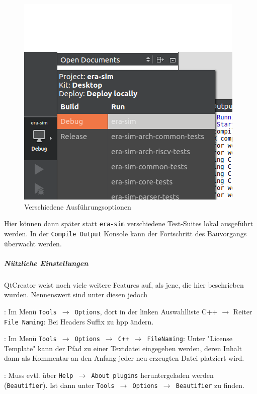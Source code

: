 \begin{figure}[h!]
	\centering
	\includegraphics[trim={1.4cm 0cm 0.5cm 2.5cm}, clip, scale=0.7]{images/setup-qtcreator-change-buildrun-flavor.png}
	\caption{Verschiedene Ausführungsoptionen}
\end{figure}

Hier können dann später statt \texttt{era-sim} verschiedene Test-Suites lokal
ausgeführt werden. In der \texttt{Compile Output} Konsole kann der Fortschritt
des Bauvorgangs überwacht werden.

\subparagraph{Nützliche Einstellungen}

QtCreator weist noch viele weitere Features auf, als jene, die hier beschrieben
wurden. Nennenswert sind unter diesen jedoch
\begin{itemize}
  : Im Menü \texttt{Tools $\rightarrow$ Options}, dort in der linken Auswahlliste C++ $\rightarrow$
  Reiter \texttt{File Naming}: Bei Headers Suffix zu hpp ändern.

  : Im Menü \texttt{Tools $\rightarrow$
  Options $\rightarrow$ C++ $\rightarrow$ FileNaming}: Unter "License Template"
  kann der Pfad zu einer Textdatei eingegeben werden, deren Inhalt dann als
  Kommentar an den Anfang jeder neu erzeugten Datei platziert wird.

  : Muss evtl. über \texttt{Help
  $\rightarrow$ About plugins} heruntergeladen werden (\texttt{Beautifier}). Ist
  dann unter \texttt{Tools $\rightarrow$ Options $\rightarrow$ Beautifier} zu
  finden.
\end{itemize}
